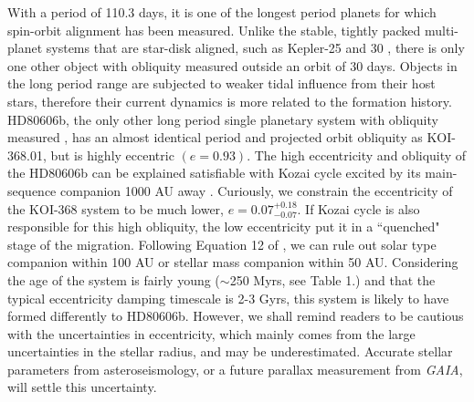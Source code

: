 \documentclass[iop]{emulateapj}
\begin{document}
With a period of 110.3 days, it is one of the longest period planets for which spin-orbit alignment has been measured. 
Unlike the stable, tightly packed multi-planet systems that 
are star-disk aligned, such as Kepler-25 and 30 \citep{Sanchis-Ojeda:2012,Albrecht:2013}, there is only one other object with obliquity measured outside an orbit of 30 days. Objects in the long period range are subjected to weaker tidal influence from their host stars, therefore their current dynamics is more related to the formation history. HD80606b, the only other long period single planetary system with obliquity measured \citep{Moutou:2009,Winn:2009}, has an almost identical period and projected orbit
obliquity as KOI-368.01, but is highly eccentric $(e=0.93)$. The high eccentricity and obliquity
of the HD80606b can be explained satisfiable with Kozai cycle excited
by its main-sequence companion 1000 AU away \citep{WuMurray:2003, FabryckyTremaine:2007}. 
Curiously, we constrain the eccentricity of the KOI-368 system to be much 
lower, $e = 0.07^{+0.18}_{-0.07}$. If Kozai cycle is also responsible for this high obliquity, the low eccentricity put it in a ``quenched" stage of the migration. Following Equation
12 of \citet{Socrates:2012}, we can rule out solar type 
companion within 100 AU or stellar mass companion within 50 AU.
Considering the age of the system is fairly young ($\sim$250 
Myrs, see Table 1.) and that the typical eccentricity damping timescale 
is 2-3 Gyrs, this system is likely to have formed differently 
to HD80606b. However, we shall remind readers to be cautious with the uncertainties in 
eccentricity, which mainly comes from the large uncertainties in the stellar 
radius, and may be underestimated. Accurate stellar parameters from asteroseismology, 
or a future parallax measurement from \emph{GAIA}, will settle this uncertainty.   

\end{document}
